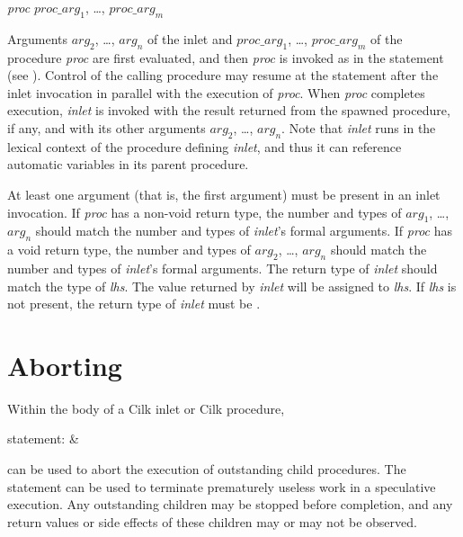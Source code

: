 \begin{syntax}
              \textit{proc} \cilkkw{(}$\textit{proc\_arg}_1$, \dots,
                $\textit{proc\_arg}_m$\cilkkw{)}
\end{syntax}
Arguments $\textit{arg}_2$, \dots, $\textit{arg}_n$ of the inlet and
$\textit{proc\_arg}_1$, \dots, $\textit{proc\_arg}_m$ of the procedure
\textit{proc} are first evaluated, and then \textit{proc} is invoked
as in the  statement (see ).
Control of the calling procedure may resume at the statement after the
inlet invocation in parallel with the execution of \textit{proc}. When
\textit{proc} completes execution, \textit{inlet} is invoked with the
result returned from the spawned procedure, if any, and with its other
arguments $\textit{arg}_2$, \dots, $\textit{arg}_n$.  Note that
\textit{inlet} runs in the lexical context of the procedure defining
\textit{inlet}, and thus it can reference automatic variables in its
parent procedure.

At least one argument (that is, the first  argument)
must be present in an inlet invocation.  If \textit{proc} has a
non-void return type, the number and types of $\textit{arg}_1$, \dots,
$\textit{arg}_n$ should match the number and types of \textit{inlet}'s
formal arguments.  If \textit{proc} has a void return type, the number
and types of $\textit{arg}_2$, \dots, $\textit{arg}_n$ should match
the number and types of \textit{inlet}'s formal arguments.  The return
type of \textit{inlet} should match the type of \textit{lhs}.  The
value returned by \textit{inlet} will be assigned to \textit{lhs}.  If
\textit{lhs} is not present, the return type of \textit{inlet} must be
.

\section{Aborting}
\label{lanref:abort-sec}

Within the body of a Cilk inlet or Cilk procedure,
\begin{syntax}
statement{\rm :} & 
\end{syntax}
\noindent can be used to abort the execution of outstanding child procedures.
The  statement can be used to terminate prematurely
useless work in a speculative execution.  Any outstanding children may
be stopped before completion, and any return values or side effects of
these children may or may not be observed.  

